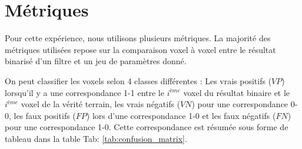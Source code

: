 \begin{table}[ht]
  \begin{center}
\end{center}
\caption{Liste des filtres disponibles dans le banc de test ainsi que leur principale caractéristique.}
\label{tab:diffMethods}
\end{table}

\section{Métriques}

Pour cette expérience, nous utilisons plusieurs métriques. La majorité des métriques utilisées repose sur la comparaison voxel à voxel entre le résultat binarisé d'un filtre et un jeu de paramètres donné.

On peut classifier les voxels selon 4 classes différentes : Les vrais positifs ($VP$) lorsqu'il y a une correspondance 1-1 entre le $i^{ème}$ voxel du résultat binaire et le $i^{ème}$ voxel de la vérité terrain, les vrais négatifs ($VN$) pour une correspondance 0-0, les faux positifs ($FP$) lors d'une correspondance 1-0 et les faux négatifs ($FN$) pour une correspondance 1-0. Cette correspondance est résumée sous forme de tableau dans la table Tab: \ref{tab:confusion_matrix}.

